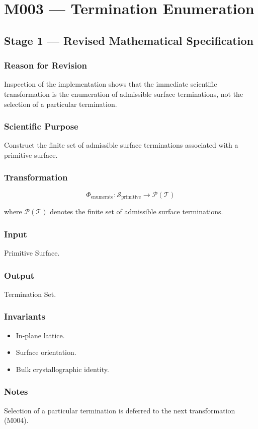 \chapter{M003 --- Termination Enumeration}

\section{Stage 1 --- Revised Mathematical Specification}

\subsection{Reason for Revision}

Inspection of the implementation shows that the immediate scientific
transformation is the enumeration of admissible surface terminations,
not the selection of a particular termination.

\subsection{Scientific Purpose}

Construct the finite set of admissible surface terminations associated
with a primitive surface.

\subsection{Transformation}

\[
\Phi_{\mathrm{enumerate}}:
\mathcal{S}_{\mathrm{primitive}}
\rightarrow
\mathcal{P}(\mathcal{T})
\]

where $\mathcal{P}(\mathcal{T})$ denotes the finite set of admissible
surface terminations.

\subsection{Input}

Primitive Surface.

\subsection{Output}

Termination Set.

\subsection{Invariants}

\begin{itemize}
\item In-plane lattice.
\item Surface orientation.
\item Bulk crystallographic identity.
\end{itemize}

\subsection{Notes}

Selection of a particular termination is deferred to the next
transformation (M004).